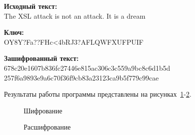\textbf{Исходный текст:} \\
    The XSL attack is not an attack. It is a dream

\textbf{Ключ:} \\
    OY8Y?Fa??FHc<4bRJ3?AFLQWFXUFPUIF

\textbf{Зашифрованный текст:} \\
    678c20e1607b836fc27446e815ac306c3c559a9bc8c6d1b5d 257f6a9893e9a6c70f36f9cb83a23123ca9b5f779c99cae

Результаты работы программы представлены на рисунках~\ref{ris:encode-test-5}-\ref{ris:decode-test-5}.

\vspace{\baselineskip}
\begin{figure}[H]
    \caption{Шифрование}
\label{ris:encode-test-5}
\end{figure}

\vspace{\baselineskip}
\begin{figure}[H]
    \caption{Расшифрование}
\label{ris:decode-test-5}
\end{figure}
